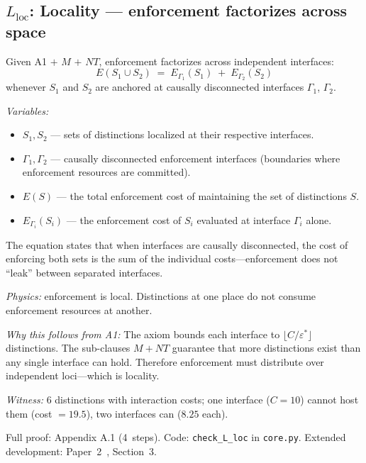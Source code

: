 \documentclass[11pt]{article}
\begin{document}
\subsection{\texorpdfstring{$L_{\mathrm{loc}}$}{Lloc}: Locality --- enforcement factorizes across space}

\begin{tcolorbox}[apfbox, title={Lemma $L_{\mathrm{loc}}$ (Locality)}]
Given A1 $+$ $M$ $+$ $NT$, enforcement factorizes across independent interfaces:
\begin{equation}
E(S_1 \cup S_2) \;=\; E_{\Gamma_1}(S_1) \;+\; E_{\Gamma_2}(S_2)
\end{equation}
whenever $S_1$ and $S_2$ are anchored at causally disconnected interfaces $\Gamma_1$, $\Gamma_2$.

\smallskip\noindent\textit{Variables:}
\begin{itemize}[nosep,leftmargin=2em]
\item $S_1, S_2$ --- sets of distinctions localized at their respective interfaces.
\item $\Gamma_1, \Gamma_2$ --- causally disconnected enforcement interfaces (boundaries where enforcement resources are committed).
\item $E(S)$ --- the total enforcement cost of maintaining the set of distinctions $S$.
\item $E_{\Gamma_i}(S_i)$ --- the enforcement cost of $S_i$ evaluated at interface $\Gamma_i$ alone.
\end{itemize}

\smallskip\noindent
The equation states that when interfaces are causally disconnected, the cost of enforcing both sets is the sum of the individual costs---enforcement does not ``leak'' between separated interfaces.
\end{tcolorbox}

\textit{Physics:} enforcement is local.  Distinctions at one place do not consume enforcement resources at another.

\textit{Why this follows from A1:} The axiom bounds each interface to $\lfloor C/\varepsilon^* \rfloor$ distinctions.  The sub-clauses $M + NT$ guarantee that more distinctions exist than any single interface can hold.  Therefore enforcement must distribute over independent loci---which is locality.

\textit{Witness:} 6 distinctions with interaction costs; one interface ($C=10$) cannot host them (cost $= 19.5$), two interfaces can ($8.25$ each).

Full proof: Appendix A.1 (4~steps).  Code: \texttt{check\_L\_loc} in \texttt{core.py}.  Extended development: Paper~2~\cite{P2}, Section~3.
\end{document}

